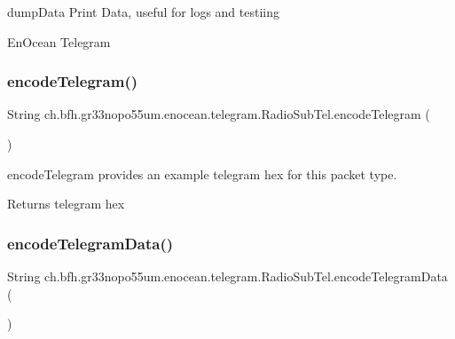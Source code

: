dump\+Data Print Data, useful for logs and testiing 

En\+Ocean Telegram \hypertarget{classch_1_1bfh_1_1gr33nopo55um_1_1enocean_1_1telegram_1_1_radio_sub_tel_a6ec56912316c317deb3a350c0c680131}{}\label{classch_1_1bfh_1_1gr33nopo55um_1_1enocean_1_1telegram_1_1_radio_sub_tel_a6ec56912316c317deb3a350c0c680131} 
\subsubsection{\texorpdfstring{encode\+Telegram()}{encodeTelegram()}}
{\footnotesize\ttfamily String ch.\+bfh.\+gr33nopo55um.\+enocean.\+telegram.\+Radio\+Sub\+Tel.\+encode\+Telegram (\begin{DoxyParamCaption}{ }\end{DoxyParamCaption})}

encode\+Telegram provides an example telegram hex for this packet type.

\begin{DoxyReturn}{Returns}
telegram hex 
\end{DoxyReturn}
\hypertarget{classch_1_1bfh_1_1gr33nopo55um_1_1enocean_1_1telegram_1_1_radio_sub_tel_a1b05997d0a80627d77c95c2fc8c90e8b}{}\label{classch_1_1bfh_1_1gr33nopo55um_1_1enocean_1_1telegram_1_1_radio_sub_tel_a1b05997d0a80627d77c95c2fc8c90e8b} 
\subsubsection{\texorpdfstring{encode\+Telegram\+Data()}{encodeTelegramData()}}
{\footnotesize\ttfamily String ch.\+bfh.\+gr33nopo55um.\+enocean.\+telegram.\+Radio\+Sub\+Tel.\+encode\+Telegram\+Data (\begin{DoxyParamCaption}{ }\end{DoxyParamCaption})}


